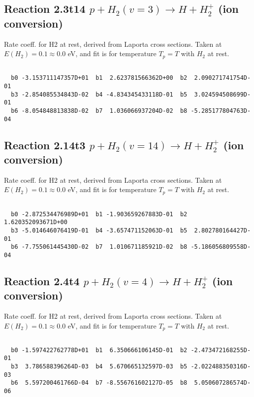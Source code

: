 \documentclass[12pt,dvipdfmx]{article}
\begin{document}
\newpage
\subsection{
Reaction 2.3t14
$ p + H_2(v=3) \rightarrow H + H_2^+$ (ion conversion)
}
Rate coeff. for H2 at rest, derived from Laporta cross sections.
Taken at $E(H_2) = 0.1 \approx 0.0$ eV,  and fit is for temperature $T_p=T$ with $H_2$ at rest.

\begin{small}\begin{verbatim}

  b0 -3.153711147357D+01  b1  2.623781566362D+00  b2  2.090271741754D-01
  b3 -2.854085534843D-02  b4 -4.834345433118D-01  b5  3.024594508699D-01
  b6 -8.054848813838D-02  b7  1.036066937204D-02  b8 -5.285177804763D-04

\end{verbatim}\end{small}

\newpage
\subsection{
Reaction 2.14t3
$ p + H_2(v=14) \rightarrow H + H_2^+$ (ion conversion)
}
Rate coeff. for H2 at rest, derived from Laporta cross sections.
Taken at $E(H_2) = 0.1 \approx 0.0$ eV,  and fit is for temperature $T_p=T$ with $H_2$ at rest.

\begin{small}\begin{verbatim}

  b0 -2.872534476989D+01  b1 -1.903659267883D-01  b2  1.620352093671D+00
  b3 -5.014646076419D-01  b4 -3.657471152063D-01  b5  2.802780164427D-01
  b6 -7.755061445430D-02  b7  1.010671185921D-02  b8 -5.186056809558D-04

\end{verbatim}\end{small}

\newpage
\subsection{
Reaction 2.4t4
$ p + H_2(v=4) \rightarrow H + H_2^+$ (ion conversion)
}
Rate coeff. for H2 at rest, derived from Laporta cross sections.
Taken at $E(H_2) = 0.1 \approx 0.0$ eV,  and fit is for temperature $T_p=T$ with $H_2$ at rest.

\begin{small}\begin{verbatim}

  b0 -1.597422762778D+01  b1  6.350666106145D-01  b2 -2.473472168255D-01
  b3  3.786588396264D-03  b4  5.670665132597D-03  b5 -2.022488350316D-03
  b6  5.597200461766D-04  b7 -8.556761602127D-05  b8  5.050607286574D-06

\end{verbatim}\end{small}
\end{document}
